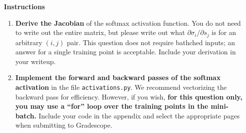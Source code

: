 \documentclass{article}
\begin{document}
\textbf{Instructions}
\begin{enumerate}
    \item 
    \textbf{Derive the Jacobian} of the softmax activation function. 
    You do not need to write out the entire matrix, but please write out what $\partial \sigma_i/\partial s_j$ is for an arbitrary $(i, j)$ pair. 
    This question does not require bathched inputs; an answer for a single training point is acceptable. 
    Include your derivation in your writeup.

    \item 
    \textbf{Implement the forward and backward passes of the softmax activation} in the file \texttt{activations.py}. 
    We recommend vectorizing the backward pass for efficiency. 
    However, if you wish, \textbf{for this question only, you may use a ``for'' loop over the training points in the mini-batch.} 
    Include your code in the appendix and select the appropriate pages when submitting to Gradescope.
\end{enumerate}
\end{document}

